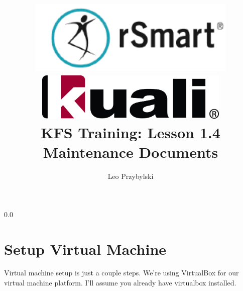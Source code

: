 \documentclass[12pt,notitlepage]{article}
\author{Leo Przybylski}
\title{\includegraphics[width=0.75\textwidth]{../img/rsmart_base.png}\\\includegraphics[width=0.70\textwidth]{../img/kuali_base.png}\\KFS
  Training: Lesson 1.4 Maintenance Documents}
\begin{document}
\maketitle
\tableofcontents
{}
{\setlength{\baselineskip}%
  {0.0\baselineskip}
  \section*{\flushright Setup Virtual Machine}
  \hrulefill \par}
 Virtual machine setup is just a couple steps. We're using VirtualBox for our virtual machine platform. I'll assume you already have virtualbox installed.
\end{document}
